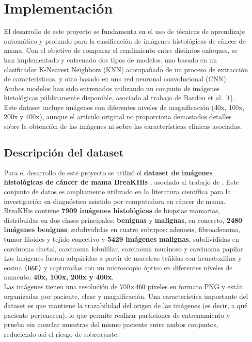 \documentclass[12pt]{article} %
\begin{document}
\section{Implementación}
El desarrollo de este proyecto se fundamenta en el uso de técnicas de aprendizaje automático y profundo para la clasificación de imágenes histológicas de cáncer de mama. Con el objetivo de comparar el rendimiento entre distintos enfoques, se han implementado y entrenado dos tipos de modelos: uno basado en un clasificador K-Nearest Neighbors (KNN) acompañado de un proceso de extracción de características, y otro basado en una red neuronal convolucional (CNN). Ambos modelos han sido entrenados utilizando un conjunto de imágenes histológicas públicamente disponible, asociado al trabajo de Bardou et al. [1]. Este dataset incluye imágenes con diferentes niveles de magnificación (40x, 100x, 200x y 400x), aunque el artículo original no proporciona demasiados detalles sobre la obtención de las imágenes ni sobre las características clínicas asociadas.\\

\subsection{Descripción del dataset}
Para el desarrollo de este proyecto se utilizó el \textbf{dataset de imágenes histológicas de cáncer de mama BreaKHis} \cite{google_drive_folder}, asociado al trabajo de \cite{bardou2018classification}. Este conjunto de datos es ampliamente utilizado en la literatura científica para la investigación en diagnóstico asistido por computadora en cáncer de mama. BreaKHis contiene \textbf{7909 imágenes histológicas} de biopsias mamarias, distribuidas en dos clases principales: \textbf{benignas} y \textbf{malignas}, en concreto, \textbf{2480 imágenes benignas}, subdivididas en cuatro subtipos: adenosis, fibroadenoma, tumor filoides y tejido conectivo y  \textbf{5429 imágenes malignas}, subdivididas en carcinoma ductal, carcinoma lobulillar, carcinoma mucinoso y carcinoma papilar. Las imágenes fueron adquiridas a partir de muestras teñidas con hematoxilina y eosina \texttt{(H\&E)} y capturadas con un microscopio óptico en diferentes niveles de aumento: \textbf{40x, 100x, 200x y 400x}.\\

Las imágenes tienen una resolución de 700×460 píxeles en formato PNG y están organizadas por paciente, clase y magnificación. Una característica importante del dataset es que mantiene la trazabilidad del origen de las imágenes (es decir, a qué paciente pertenecen), lo que permite realizar particiones de entrenamiento y prueba sin mezclar muestras del mismo paciente entre ambos conjuntos, reduciendo así el riesgo de sobreajuste.
\end{document}
